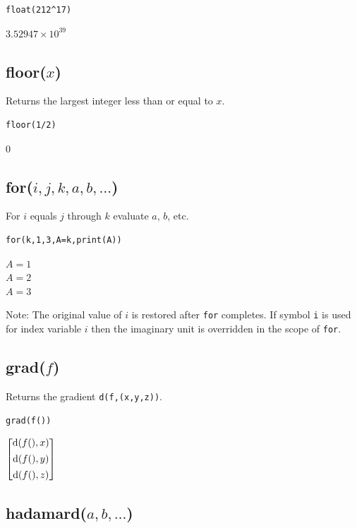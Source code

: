 \documentclass[12pt]{article}
\begin{document}
{\color{blue}
\begin{verbatim}
float(212^17)
\end{verbatim}
}

\noindent
$\displaystyle 3.52947\times 10^{39}$

\subsection*{floor($x$)}

Returns the largest integer less than or equal to $x$.

{\color{blue}
\begin{verbatim}
floor(1/2)
\end{verbatim}
}

\noindent
$0$

\subsection*{for($i,j,k,a,b,\ldots$)}

For $i$ equals $j$ through $k$ evaluate $a$, $b$, etc.

{\color{blue}
\begin{verbatim}
for(k,1,3,A=k,print(A))
\end{verbatim}
}

\noindent
$A=1$\\
$A=2$\\
$A=3$

\bigskip
\noindent
Note: The original value of $i$ is restored after {\tt for} completes.
If symbol {\tt i} is used for index variable $i$
then the imaginary unit is overridden in the scope of {\tt for}.

\subsection*{grad($f$)}

Returns the gradient \verb$d(f,(x,y,z))$.

{\color{blue}
\begin{verbatim}
grad(f())
\end{verbatim}
}

\noindent
$\displaystyle
\begin{bmatrix}
{\rm d}(f(),x)
\\[1ex]
{\rm d}(f(),y)
\\[1ex]
{\rm d}(f(),z)
\end{bmatrix}
$

\subsection*{hadamard($a,b,\ldots$)}
\end{document}
